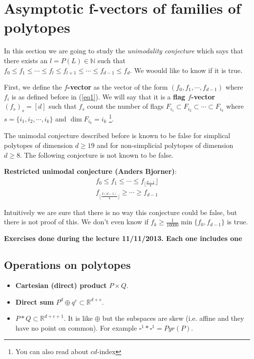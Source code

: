 \chapter{Asymptotic f-vectors of families of polytopes}


In this section we are going to study the \textit{unimodality conjecture} which says that there exists an $l = P(L)\in\mathbb{N}$ such that $f_0\leq f_1 \leq \cdots\leq f_l \leq f_{l+1}\leq \cdots \leq f_{d-1}\leq f_d$. We woould like to know if it is true. 

First, we define the \textbf{$f$-vector} as the vector of the form $(f_0,f_{1},\cdots,f_{d-1})$ where $f_i$ is as defined before in (\ref{eq1}). We will say that it is a \textbf{flag $f$-vector} $(f_s)_s = [d]$ such that $f_s$ count the number of flags $F_{i_1} \subset F_{i_2} \subset \cdots \subset F_{i_k}$ where $s = \{i_1,i_2,\cdots, i_k \}$ and $\dim F_{i_k} = i_k$ \footnote{You can also read about $cd$-index}.

\bigskip
The unimodal conjecture described before is known to be false for simplical polytopes of dimension $d\geq 19$ and for non-simplicial polytopes of dimension $d \geq 8$. The following conjecture is not known to be false. 

\textbf{Restricted unimodal conjecture (Anders Bjorner)}: 
\begin{eqnarray*}
 f_0\leq f_1\leq \cdots \leq f_{\lfloor \frac{d-1}{4}}\rfloor\\
 f_{\lfloor \frac{3(d-1)}{4}\rfloor}\geq \cdots \geq f_{d-1}
\end{eqnarray*} 

Intuitively we are sure that there is no way this conjecture could be false, but there is not proof of this. We don't even know if $f_k\geq \frac{1}{10000}\min\{f_0,f_{d-1}\}$ is true.

\bigskip

\textbf{Exercises done during the lecture 11/11/2013. Each one includes one}


\section{Operations on polytopes}
\begin{itemize}
\item \textbf{Cartesian (direct) product} $P\times Q$.
\item \textbf{Direct sum} $P^d \oplus q^e \subset \mathbb{R}^{d+e}$.
\item $P*Q\subset \mathbb{R}^{d+e+1}$. It is like $\oplus$ but the subspaces are skew (i.e. affine and they have no point on common). For example $\square^1 *\square^1 = Pyr(P)$.
\end{itemize}

